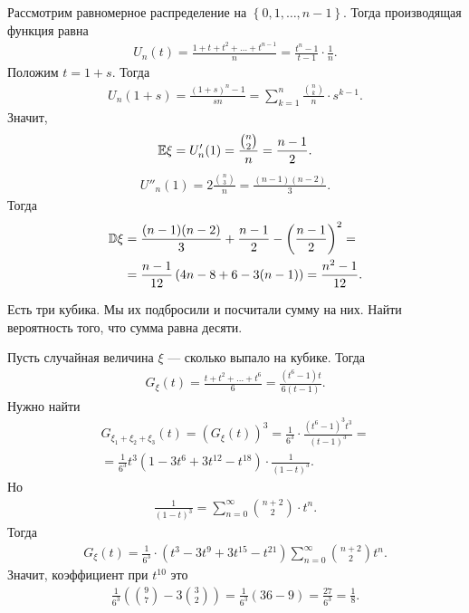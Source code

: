 \documentclass[../main.tex]{subfiles}
\begin{document}
\begin{exmpl}
 Рассмотрим равномерное распределение на $  \left\{ 0,1,\ldots,n-1 \right\} $. Тогда производящая функция равна
 \begin{align*}
  U_n(t) = \frac{1 + t + t^{2} + \ldots + t^{n-1}}{n} = \frac{t^{n}-1}{t-1} \cdot \frac{1}{n}.
 \end{align*} Положим $ t = 1 + s $. Тогда
 \begin{align*}
  U_n(1 + s) = \frac{(1+s)^{n} - 1}{sn} = \sum_{k=1}^{n} \frac{\binom n k}{n} \cdot s^{k-1}.
 \end{align*} Значит,
 \begin{align*}
  \mathbb E \xi = U'_n(1) = \frac{\binom n 2}{n} = \frac{n-1}{2}.
 \end{align*}
 \begin{align*}
  U''_n(1) = 2 \frac{\binom n 3}{n} = \frac{(n-1)(n-2)}{3}.
 \end{align*} Тогда
 \begin{align*}
  \mathbb D \xi &= \frac{(n-1)(n-2)}{3} + \frac{n-1}{2} - \left( \frac{n-1}{2} \right)^{2} = \\
  &= \frac{n - 1}{12} \left( 4n - 8 + 6 - 3(n - 1) \right) = \frac{n^{2}-1}{12}.
 \end{align*}
\end{exmpl}

\begin{exmpl}
 Есть три кубика. Мы их подбросили и посчитали сумму на них. Найти вероятность того, что сумма равна десяти.

 Пусть случайная величина $ \xi $ --- сколько выпало на кубике. Тогда
 \begin{align*}
  G_\xi(t) = \frac{t + t^{2} + \ldots + t^{6}}{6} = \frac{(t^{6}-1)t}{6(t-1)}.
 \end{align*} Нужно найти
 \begin{align*}
  G_{\xi_1 + \xi_2 + \xi_3}(t) = (G_\xi(t))^{3} = \frac{1}{6^{3}} \cdot \frac{(t^{6}-1)^{3}t^{3}}{(t-1)^{3}} = \\
  = \frac{1}{6^{3}} t^{3}(1 - 3t^{6} + 3t^{12} - t^{18}) \cdot \frac{1}{(1-t)^{3}}.
 \end{align*} Но
 \begin{align*}
  \frac{1}{(1-t)^{3}} = \sum_{n=0}^{\infty} \binom {n+2} 2 \cdot t^{n}.
 \end{align*} Тогда
 \begin{align*}
  G_{\xi}(t) =\frac{1}{6^{3}} \cdot (t^{3}-3t^{9}+3t^{15}-t^{21}) \sum_{n=0}^{\infty}\binom {n+2} 2 t^{n}.
 \end{align*} Значит, коэффициент при $ t^{10} $ это
 \begin{align*}
  \frac{1}{6^{3}} \left( \binom 9 7 - 3 \binom 3 2 \right) = \frac{1}{6^{3}} \left( 36 - 9 \right) = \frac{27}{6^{3}} = \frac{1}{8}.
 \end{align*}
\end{exmpl}
\end{document}
